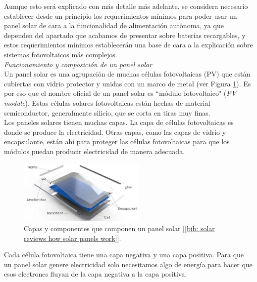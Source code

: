 \documentclass[12pt]{article}
\begin{document}
	\noindent Aunque esto será explicado con más detalle más adelante, se considera necesario establecer desde un principio los requerimientos mínimos para poder usar un panel solar de cara a la funcionalidad de alimentación autónoma, ya que dependen del apartado que acabamos de presentar sobre baterías recargables, y estos requerimientos mínimos establecerán una base de cara a la explicación sobre sistemas fotovoltaicos más complejos. \\
	
	\noindent \textit{Funcionamiento y composición de un panel solar}\\

	
	\noindent Un panel solar es una agrupación de muchas células fotovoltaicas (PV) que están cubiertas con vidrio protector y unidas con un marco de metal (ver Figura \ref{fig: capas panel solar}). Es por eso que el nombre oficial de un panel solar es ``módulo fotovoltaico" (\textit{PV module}). Estas células solares fotovoltaicas están hechas de material semiconductor, generalmente silicio, que se corta en tiras muy finas.\\
	
	\noindent Los paneles solares tienen muchas capas. La capa de células fotovoltaicas es donde se produce la electricidad. Otras capas, como las capas de vidrio y encapsulante, están ahí para proteger las células fotovoltaicas para que los módulos puedan producir electricidad de manera adecuada.\\
	
	\pagebreak
	
	\begin{figure}[h!]
		\begin{center}
			\includegraphics[width=0.55\textwidth]{img/layersSolarPanel.png}
			\caption{Capas y componentes que componen un panel solar [\ref{bib: solar reviews how solar panels work}].}
			\label{fig: capas panel solar}
		\end{center}
	\end{figure}

	\noindent Cada célula fotovoltaica tiene una capa negativa y una capa positiva. Para que un panel solar genere electricidad solo necesitamos algo de energía para hacer que esos electrones fluyan de la capa negativa a la capa positiva. \\
	
\end{document}
